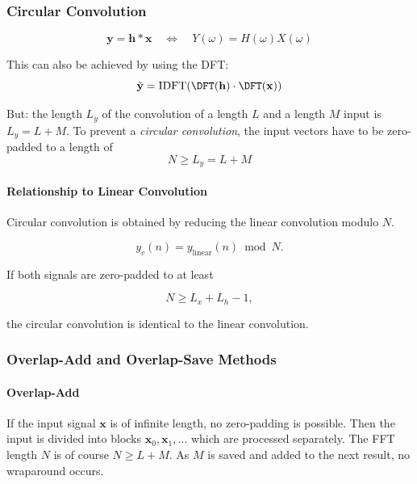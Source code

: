 \subsubsection{Circular Convolution}

\begin{equation*}
	\mathbf{y} = \mathbf{h} \ast \mathbf{x} \quad\Leftrightarrow\quad Y(\omega) = H(\omega) X(\omega)
\end{equation*}

This can also be achieved by using the DFT:
\begin{equation*}
	\tilde{\mathbf{y}} = \text{IDFT}(\DFT(\mathbf{h}) \cdot \DFT(\mathbf{x}))
\end{equation*}

But: the length $L_y$ of the convolution of a length $L$ and a length $M$
input is $L_y = L + M$. To prevent a \emph{circular convolution}, the
input vectors have to be zero-padded to a length of
\begin{equation*}
	N \geq L_y = L+M
\end{equation*}

\paragraph{Relationship to Linear Convolution}

Circular convolution is obtained by reducing the linear convolution
modulo \(N\).

\[
y_c(n)
=
y_{\text{linear}}(n)
\bmod N.
\]

If both signals are zero-padded to at least

\[
N\ge L_x+L_h-1,
\]

the circular convolution is identical to the linear convolution.

\subsubsection{Overlap-Add and Overlap-Save Methods}

\paragraph{Overlap-Add}
If the input signal $\mathbf{x}$ is of infinite length, no zero-padding
is possible. Then the input is divided into blocks
$\mathbf{x}_0, \mathbf{x}_1, \ldots$ which are processed separately.
The FFT length $N$ is of course $N \geq L+M$. As $M$ is saved and added
to the next result, no wraparound occurs.

